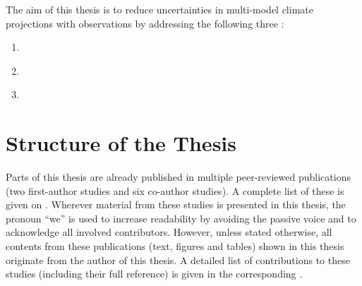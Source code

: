 The aim of this thesis is to reduce uncertainties in multi-model climate
projections with observations by addressing the following three
:

\begingroup
{}
\begin{enumerate}
  \item \label{enum:01:question_1} \KeyScienceQuestionOne{}
  \item \label{enum:01:question_2} \KeyScienceQuestionTwo{}
  \item \label{enum:01:question_3} \KeyScienceQuestionThree{}
\end{enumerate}
\endgroup


\section{Structure of the Thesis}
\label{sec:01:structure}

Parts of this thesis are already published in multiple peer-reviewed
publications (two first-author studies and six co-author studies). A complete
list of these is given on . Wherever material from these
studies is presented in this thesis, the pronoun \enquote{we} is used to
increase readability by avoiding the passive voice and to acknowledge all
involved contributors. However, unless stated otherwise, all contents from
these publications (text, figures and tables) shown in this thesis originate
from the author of this thesis. A detailed list of contributions to these
studies (including their full reference) is given in the corresponding
.

